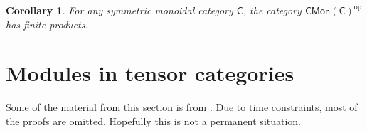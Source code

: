 \documentclass[a4paper,10pt]{scrreprt}
\def\mhyp{{\hbox{-}}}
\theoremstyle{definition}
\newtheorem{definition}{Definition}[section]
\theoremstyle{plain}
\newtheorem{corollary}{Corollary}[section]
\theoremstyle{remark}
\begin{document}
\begin{corollary}
  \label{cor:cmonophasproducts}
  For any symmetric monoidal category $\mathsf{C}$, the category $\mathsf{CMon}(\mathsf{C})^{\mathrm{op}}$ has finite products.
\end{corollary}


\section{Modules in tensor categories}
Some of the material from this section is from \cite{nestruev-smooth-manifolds-observables}. Due to time constraints, most of the proofs are omitted. Hopefully this is not a permanent situation.

% 
% 
% 
\end{document}
